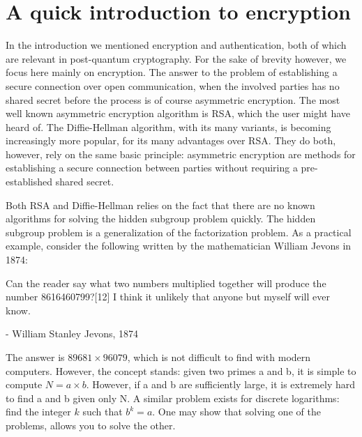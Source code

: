 \documentclass[conference]{IEEEtran}
\begin{document}
\section{A quick introduction to encryption}
In the introduction we mentioned encryption and authentication, both of which are relevant in post-quantum cryptography.
For the sake of brevity however, we focus here mainly on encryption.
The answer to the problem of establishing a secure connection over open communication, when the involved parties has no shared secret before the process is of course asymmetric encryption.
The most well known asymmetric encryption algorithm is RSA, which the user might have heard of.
The Diffie-Hellman algorithm, with its many variants, is becoming increasingly more popular, for its many advantages over RSA.
They do both, however, rely on the same basic principle: asymmetric encryption are methods for establishing a secure connection between parties without requiring a pre-established shared secret.

Both RSA and Diffie-Hellman relies on the fact that there are no known algorithms for solving the hidden subgroup problem quickly.
The hidden subgroup problem is a generalization of the factorization problem.
As a practical example, consider the following written by the mathematician William Jevons in 1874:
\begin{quoting}
Can the reader say what two numbers multiplied together will produce the number 8616460799?[12] I think it unlikely that anyone but myself will ever know.
 
- William Stanley Jevons, 1874
\end{quoting}
The answer is $89681 \times 96079$, which is not difficult to find with modern computers.
However, the concept stands: given two primes a and b, it is simple to compute $N = a \times b$.
However, if a and b are sufficiently large, it is extremely hard to find a and b given only N.
A similar problem exists for discrete logarithms: find the integer $k$ such that $b^k = a$.
One may show that solving one of the problems, allows you to solve the other.
\end{document}
